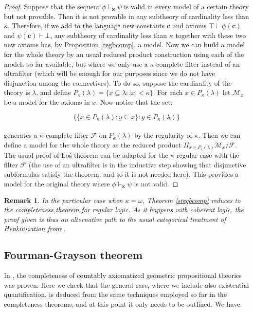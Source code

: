 \documentclass[a4paper,11pt]{article}
\theoremstyle{plain}
\newtheorem{rmk}[thm]{Remark}
\theoremstyle{plain}
\theoremstyle{remark}
\begin{document}
\begin{proof}
 Suppose that the sequent $\phi \vdash_{\mathbf{x}} \psi$ is valid in every model of a certain theory but not provable. Then it is not provable in any subtheory of cardinality less than $\kappa$. Therefore, if we add to the language new constants $\mathbf{c}$ and axioms $\top \vdash \phi(\mathbf{c})$ and $\psi(\mathbf{c}) \vdash \bot$, any subtheory of cardinality less than $\kappa$ together with these two new axioms has, by Proposition \ref{regbcomp}, a model. Now we can build a model for  the whole theory by an usual reduced product construction using each of the models so far available, but where we only use a $\kappa$-complete filter instead of an ultrafilter (which will be enough for our purposes since we do not have disjunction among the connectives). To do so, suppose the cardinality of the theory is $\lambda$, and define $P_{\kappa}(\lambda)=\{x \subseteq \lambda: |x|<\kappa\}$. For each $x \in P_{\kappa}(\lambda)$ let $\mathcal{M}_x$ be a model for the axioms in $x$. Now notice that the set:
 
 $$\{\{x \in P_{\kappa}(\lambda): y \subseteq x\}: y \in P_{\kappa}(\lambda)\}$$
 \\
 generates a $\kappa$-complete filter $\mathcal{F}$ on $P_{\kappa}(\lambda)$ by the regularity of $\kappa$. Then we can define a model for the whole theory as the reduced product $\Pi_{x \in P_{\kappa}(\lambda)}\mathcal{M}_x / \mathcal{F}$. The usual proof of \L{}o\'s theorem can be adapted for the $\kappa$-regular case with the filter $\mathcal{F}$ (the use of an ultrafilter is in the inductive step showing that disjunctive subformulas satisfy the theorem, and so it is not needed here). This provides a model for the original theory where $\phi \vdash_{\mathbf{x}} \psi$ is not valid.
\end{proof}

\begin{rmk}
In the particular case when $\kappa=\omega$, Theorem \ref{sregbcomp} reduces to the completeness theorem for regular logic. As it happens with coherent logic, the proof given is thus an alternative path to the usual categorical treatment of Henkinization from \cite{johnstone}.
\end{rmk}


\subsection{Fourman-Grayson theorem}

In \cite{fourman}, the completeness of countably axiomatized geometric propositional theories was proven. Here we check that the general case, where we include also existential quantification, is deduced from the same techniques employed so far in the completeness theorems, and at this point it only needs to be outlined. We have:
\end{document}
